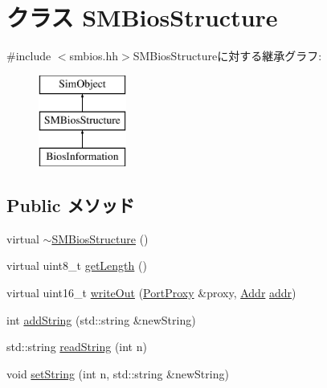 \hypertarget{classX86ISA_1_1SMBios_1_1SMBiosStructure}{
\section{クラス SMBiosStructure}
\label{classX86ISA_1_1SMBios_1_1SMBiosStructure}
}


{\ttfamily \#include $<$smbios.hh$>$}SMBiosStructureに対する継承グラフ:\begin{figure}[H]
\begin{center}
\leavevmode
\includegraphics[height=3cm]{classX86ISA_1_1SMBios_1_1SMBiosStructure}
\end{center}
\end{figure}
\subsection*{Public メソッド}
\begin{DoxyCompactItemize}
\item 
virtual \hyperlink{classX86ISA_1_1SMBios_1_1SMBiosStructure_aa6b1cb47e97aa37b3873b78bc23d1e72}{$\sim$SMBiosStructure} ()
\item 
virtual uint8\_\-t \hyperlink{classX86ISA_1_1SMBios_1_1SMBiosStructure_a63b44afdbd3bcc5b87e2e443ceaa4d61}{getLength} ()
\item 
virtual uint16\_\-t \hyperlink{classX86ISA_1_1SMBios_1_1SMBiosStructure_a2dbf6f51e91cb24abfc247d73c0b857d}{writeOut} (\hyperlink{classPortProxy}{PortProxy} \&proxy, \hyperlink{base_2types_8hh_af1bb03d6a4ee096394a6749f0a169232}{Addr} \hyperlink{namespaceX86ISA_ab705917f60c5566f9ce56a93f798b2e2}{addr})
\item 
int \hyperlink{classX86ISA_1_1SMBios_1_1SMBiosStructure_a860fda500f787a505416d7b8d240d2b2}{addString} (std::string \&newString)
\item 
std::string \hyperlink{classX86ISA_1_1SMBios_1_1SMBiosStructure_aea7304527c54463aff456fe8665198f1}{readString} (int n)
\item 
void \hyperlink{classX86ISA_1_1SMBios_1_1SMBiosStructure_adf03e658712a91de33e3737cdc0e2bec}{setString} (int n, std::string \&newString)
\end{DoxyCompactItemize}
